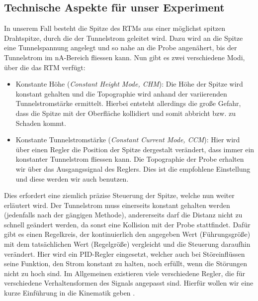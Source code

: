 \subsection{Technische Aspekte für unser Experiment}
In unserem Fall besteht die Spitze des RTMs aus einer möglichst spitzen
Drahtspitze, durch die der Tunnelstrom geleitet wird. Dazu wird an die Spitze eine 
Tunnelspannung angelegt und so nahe an die Probe angenähert, bis der Tunnelstrom 
im nA-Bereich fliessen kann.
Nun gibt es zwei verschiedene Modi, über die das RTM verfügt:
\begin{itemize}
\item Konstante Höhe (\textit{Constant Height Mode, CHM}): Die Höhe der Spitze wird konstant
gehalten und die Topographie wird anhand der variierenden Tunnelstromstärke ermittelt. Hierbei
entsteht allerdings die große Gefahr, dass die Spitze mit der Oberfläche kollidiert und somit
abbricht bzw. zu Schaden kommt.
\item Konstante Tunnelstromstärke (\textit{Constant Current Mode, CCM}): Hier wird über einen
Regler die Position der Spitze dergestalt verändert, dass immer ein konstanter Tunnelstrom 
fliessen kann. Die Topographie der Probe erhalten wir über das Ausgangssignal des Reglers.
Dies ist die empfohlene Einstellung und diese werden wir auch benutzen.
\end{itemize}
Dies erfordert eine ziemlich präzise Steuerung der Spitze, welche nun weiter erläutert wird.
Der Tunnelstrom muss einerseits konstant gehalten werden (jedenfalls nach der gängigen Methode),
andererseits darf die Distanz nicht zu schnell geändert werden, da sonst eine Kollision mit der
Probe stattfindet. Dafür gibt es einen Regelkreis, der kontinuierlich den angegeben Wert
(Führungsgröße) mit dem
tatsächlichen Wert (Regelgröße) vergleicht und
die Steuerung daraufhin verändert. Hier wird ein PID-Regler
eingesetzt, welcher auch bei Störeinflüssen seine Funktion, den Strom konstant zu halten,
noch erfüllt, wenn die Störungen nicht zu hoch sind. Im Allgemeinen existieren viele
verschiedene Regler, die für verschiedene Verhaltensformen des Signals angepasst sind. 
Hierfür wollen wir eine kurze Einführung in die Kinematik geben \cite{regelungstechnik}.
